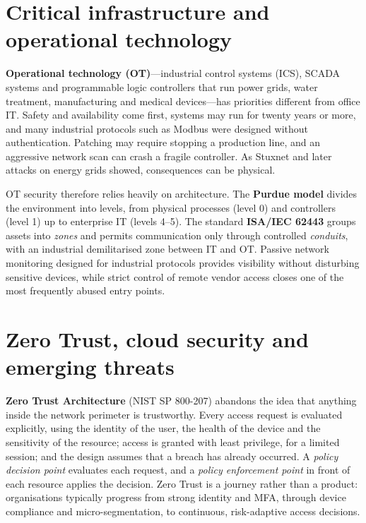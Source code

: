 \documentclass[11pt,openany]{book}
\begin{document}
\section{Critical infrastructure and operational technology}\label{sec:13.6}
\textbf{Operational technology (OT)}—industrial control systems (ICS), SCADA systems and programmable logic controllers that run power grids, water treatment, manufacturing and medical devices—has priorities different from office IT. Safety and availability come first, systems may run for twenty years or more, and many industrial protocols such as Modbus were designed without authentication. Patching may require stopping a production line, and an aggressive network scan can crash a fragile controller. As Stuxnet and later attacks on energy grids showed, consequences can be physical.

OT security therefore relies heavily on architecture. The \textbf{Purdue model} divides the environment into levels, from physical processes (level 0) and controllers (level 1) up to enterprise IT (levels 4–5). The standard \textbf{ISA/IEC 62443} groups assets into \emph{zones} and permits communication only through controlled \emph{conduits}, with an industrial demilitarised zone between IT and OT. Passive network monitoring designed for industrial protocols provides visibility without disturbing sensitive devices, while strict control of remote vendor access closes one of the most frequently abused entry points.

\section{Zero Trust, cloud security and emerging threats}\label{sec:13.7}
\textbf{Zero Trust Architecture} (NIST SP 800-207) abandons the idea that anything inside the network perimeter is trustworthy. Every access request is evaluated explicitly, using the identity of the user, the health of the device and the sensitivity of the resource; access is granted with least privilege, for a limited session; and the design assumes that a breach has already occurred. A \emph{policy decision point} evaluates each request, and a \emph{policy enforcement point} in front of each resource applies the decision. Zero Trust is a journey rather than a product: organisations typically progress from strong identity and MFA, through device compliance and micro-segmentation, to continuous, risk-adaptive access decisions.
\end{document}
